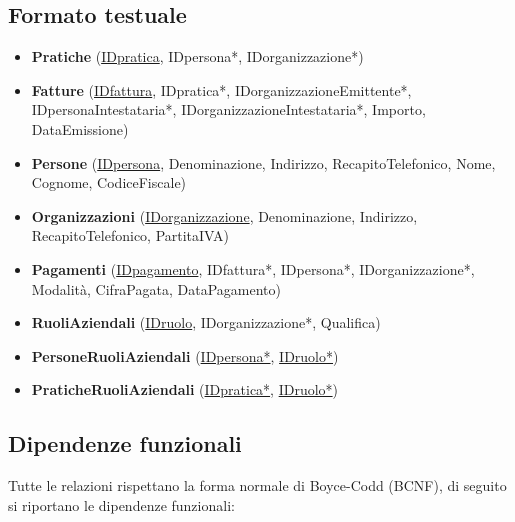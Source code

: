 \documentclass[a4paper,12pt]{article}
\begin{document}
 \subsection{ Formato testuale }

\begin{itemize}
\item \textbf{Pratiche} (\underline{IDpratica}, IDpersona*, IDorganizzazione*)

\item \textbf{Fatture} (\underline{IDfattura}, IDpratica*, IDorganizzazioneEmittente*, IDpersonaIntestataria*, IDorganizzazioneIntestataria*, Importo, DataEmissione)

\item \textbf{Persone} (\underline{IDpersona}, Denominazione, Indirizzo, RecapitoTelefonico, Nome, Cognome, CodiceFiscale)

\item \textbf{Organizzazioni} (\underline{IDorganizzazione}, Denominazione, Indirizzo, RecapitoTelefonico, PartitaIVA)

\item \textbf{Pagamenti} (\underline{IDpagamento}, IDfattura*, IDpersona*, IDorganizzazione*, Modalità, CifraPagata, DataPagamento)

\item \textbf{RuoliAziendali} (\underline{IDruolo}, IDorganizzazione*, Qualifica)

\item \textbf{PersoneRuoliAziendali} (\underline{IDpersona*}, \underline{IDruolo*})

\item \textbf{PraticheRuoliAziendali} (\underline{IDpratica*}, \underline{IDruolo*})
\end{itemize}


 \subsection{ Dipendenze funzionali }

Tutte le relazioni rispettano la forma normale di Boyce-Codd (BCNF), di seguito si riportano le dipendenze funzionali:
\end{document}
